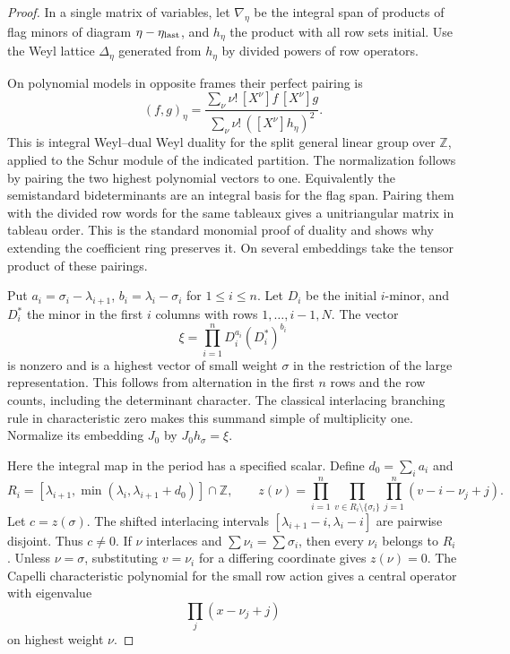 \begin{proof}
In a single matrix of variables, let \(\nabla_\eta\) be the
integral span of products of flag minors of diagram
\(\eta-\eta_{\rm last}\), and \(h_\eta\) the product with all
row sets initial. Use the Weyl lattice \(\Delta_\eta\) generated
from \(h_\eta\) by divided powers of row operators.

On polynomial
models in opposite frames their perfect pairing is
\[
 (f,g)_\eta=
 \frac{\sum_\nu \nu!\,[X^\nu]f\,[X^\nu]g}
      {\sum_\nu \nu!\,([X^\nu]h_\eta)^2}.
\]
This is integral Weyl--dual Weyl duality for the split general
linear group over \(\mathbb Z\), applied to the Schur module
of the indicated partition. The normalization follows by pairing
the two highest polynomial vectors to one. Equivalently the
semistandard bideterminants are an integral basis for the flag
span. Pairing them with the divided row words for the same
tableaux gives a unitriangular matrix in tableau order. This
is the standard monomial proof of duality and shows why extending
the coefficient ring preserves it. On several embeddings take
the tensor product of these pairings. \label{cor:terminal-realization-1}

Put \(a_i=\sigma_i-\lambda_{i+1}\), \(b_i=\lambda_i-\sigma_i\)
for \(1\le i\le n\). Let \(D_i\) be the initial \(i\)-minor,
and \(D_i^*\) the minor in the first \(i\) columns with rows
\(1,\ldots,i-1,N\). The vector
\[
              \xi=\prod_{i=1}^n D_i^{a_i}(D_i^*)^{b_i}
\]
is nonzero and is a highest vector of small weight \(\sigma\)
in the restriction of the large representation. This follows
from alternation in the first \(n\) rows and the row counts,
including the determinant character. The classical interlacing
branching rule in characteristic zero makes this summand simple
of multiplicity one. Normalize its embedding \(J_0\) by
\(J_0 h_\sigma=\xi\).

Here the integral map in the period has a specified scalar.
Define \(d_0=\sum_i a_i\) and
\[
 R_i=[\lambda_{i+1},\min(\lambda_i,\lambda_{i+1}+d_0)]\cap\mathbb Z,
 \qquad
 z(\nu)=\prod_{i=1}^n\prod_{v\in R_i\setminus\{\sigma_i\}}
                      \prod_{j=1}^n(v-i-\nu_j+j).
\]
Let \(c=z(\sigma)\). The shifted interlacing intervals
\([\lambda_{i+1}-i,\lambda_i-i]\) are pairwise disjoint.
Thus \(c\ne0\). If \(\nu\) interlaces and
\(\sum\nu_i=\sum\sigma_i\), then every \(\nu_i\) belongs to
\(R_i\). Unless \(\nu=\sigma\), substituting \(v=\nu_i\) for
a differing coordinate gives \(z(\nu)=0\). The Capelli
characteristic polynomial for the small row action gives a
central operator with eigenvalue 
\[
  \prod_j(x-\nu_j+j)
\]
on highest weight \(\nu\).


\end{proof}

